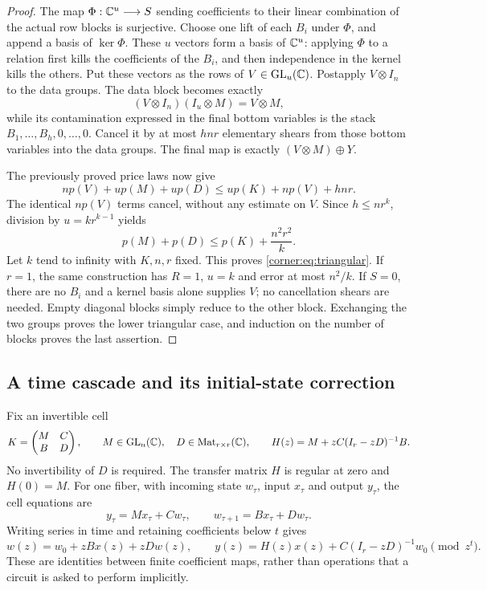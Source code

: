 \begin{proof}
The map $\Phi:\mathbb C^u\longrightarrow S$ sending coefficients to their
linear combination of the actual row blocks is surjective.  Choose
one lift of each $B_i$ under $\Phi$, and append a basis of
$\ker\Phi$.  These $u$ vectors form a basis of $\mathbb C^u$: applying
$\Phi$ to a relation first kills the coefficients of the $B_i$, and
then independence in the kernel kills the others.  Put these vectors
as the rows of $V\in\operatorname{GL}_u(\mathbb C)$.  Postapply $V\otimes I_n$ to the
data groups.  The data block becomes exactly
\[
 (V\otimes I_n)(I_u\otimes M)=V\otimes M,
\]
while its contamination expressed in the final bottom variables is
the stack $B_1,\ldots,B_h,0,\ldots,0$.  Cancel it by at most $hnr$
elementary shears from those bottom variables into the data groups.
The final map is exactly $(V\otimes M)\oplus Y$.

The previously proved price laws now give
\[
 n p(V)+u p(M)+u p(D)
 \le u p(K)+n p(V)+hnr.
\]
The identical $n p(V)$ terms cancel, without any estimate on $V$.
Since $h\le nr^k$, division by $u=kr^{k-1}$ yields
\[
 p(M)+p(D)\le p(K)+\frac{n^2r^2}{k}.
\]
Let $k$ tend to infinity with $K,n,r$ fixed.  This proves
\cref{corner:eq:triangular}.  If $r=1$, the same construction has
$R=1$, $u=k$ and error at most $n^2/k$.  If $S=0$, there are no
$B_i$ and a kernel basis alone supplies $V$; no cancellation shears
are needed.  Empty diagonal blocks simply reduce to the other block.
Exchanging the two groups proves the lower triangular case, and
induction on the number of blocks proves the last assertion.
\end{proof}

\subsection{A time cascade and its initial-state correction}

Fix an invertible cell
\begin{equation}
 K=\begin{pmatrix}M&C\\B&D\end{pmatrix},\qquad
 M\in\operatorname{GL}_n(\mathbb C),\quad D\in\operatorname{Mat}_{r\times r}(\mathbb C),
 \qquad H(z)=M+zC(I_r-zD)^{-1}B.
 \label{corner:eq:cell}
\end{equation}
No invertibility of $D$ is required.  The transfer matrix $H$ is
regular at zero and $H(0)=M$.  For one fiber, with incoming state
$w_\tau$, input $x_\tau$ and output $y_\tau$, the cell equations are
\[
 y_\tau=Mx_\tau+Cw_\tau,\qquad
 w_{\tau+1}=Bx_\tau+Dw_\tau.
\]
Writing series in time and retaining coefficients below $t$ gives
\[
 w(z)=w_0+zBx(z)+zDw(z),\qquad
 y(z)=H(z)x(z)+C(I_r-zD)^{-1}w_0 \pmod {z^t}.
\]
These are identities between finite coefficient maps, rather than
operations that a circuit is asked to perform implicitly.

